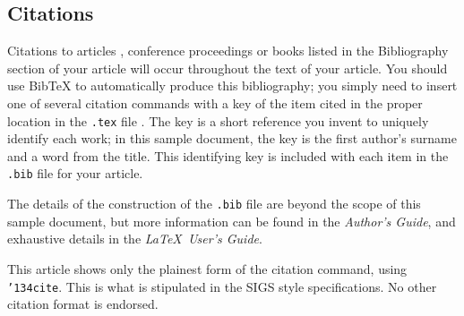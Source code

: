 \documentclass{acm_proc_article-sp}
\begin{document}




\subsection{Citations}
Citations to articles \cite{bowman:reasoning, clark:pct, braams:babel, herlihy:methodology},
conference
proceedings \cite{clark:pct} or books \cite{salas:calculus, Lamport:LaTeX} listed
in the Bibliography section of your
article will occur throughout the text of your article.
You should use BibTeX to automatically produce this bibliography;
you simply need to insert one of several citation commands with
a key of the item cited in the proper location in
the \texttt{.tex} file \cite{Lamport:LaTeX}.
The key is a short reference you invent to uniquely
identify each work; in this sample document, the key is
the first author's surname and a
word from the title.  This identifying key is included
with each item in the \texttt{.bib} file for your article.

The details of the construction of the \texttt{.bib} file
are beyond the scope of this sample document, but more
information can be found in the \textit{Author's Guide},
and exhaustive details in the \textit{\LaTeX\ User's
Guide}\cite{Lamport:LaTeX}.

This article shows only the plainest form
of the citation command, using \texttt{{\char'134}cite}.
This is what is stipulated in the SIGS style specifications.
No other citation format is endorsed.
\end{document}
